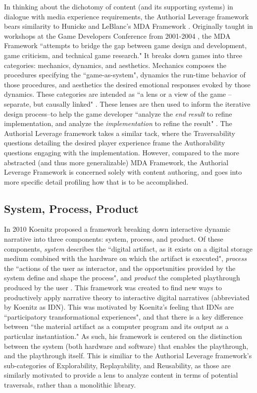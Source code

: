 In thinking about the dichotomy of content (and its supporting systems) in dialogue with media experience requirements, the Authorial Leverage framework bears similarity to Hunicke and LeBlanc's MDA Framework \cite{hunicke2004mda}. Originally taught in workshops at the Game Developers Conference from 2001-2004 \cite{leblanc_2001}, the MDA Framework ``attempts to bridge the gap between game design and development, game criticism, and technical game research." It breaks down games into three categories: mechanics, dynamics, and aesthetics. Mechanics composes the procedures specifying the ``game-as-system", dynamics the run-time behavior of those procedures, and aesthetics the desired emotional responses evoked by those dynamics. These categories are intended as ``a lens or a view of the game -- separate, but causally linked" \cite{leblanc_2004}. These lenses are then used to inform the iterative design process--to help the game developer ``analyze the \textit{end result} to refine implementation, and analyze the \textit{implementation} to refine the result" \cite{hunicke2004mda}. The Authorial Leverage framework takes a similar tack, where the Traversability questions detailing the desired player experience frame the Authorability questions engaging with the implementation. However, compared to the more abstracted (and thus more generalizable) MDA Framework, the Authorial Leverage Framework is concerned solely with content authoring, and goes into more specific detail profiling how that is to be accomplished.

\subsection{System, Process, Product}

In 2010 Koenitz proposed a framework breaking down interactive dynamic narrative into three components: system, process, and product. Of these components, \textit{system} describes the ``digital artifact, as it exists on a digital storage medium combined with the hardware on which the artifact is executed", \textit{process} the ``actions of the user as interactor, and the opportunities provided by the system define and shape the process", and \textit{product} the completed playthrough produced by the user \cite{koenitz_framework}. This framework was created to find new ways to productively apply narrative theory to interactive digital narratives (abbreviated by Koenitz as IDN). This was motivated by Koenitz's feeling that IDNs are ``participatory transformational experiences", and that there is a key difference between ``the material artifact as a computer program and its output as a particular instantiation." As such, his framework is centered on the distinction between the system (both hardware and software) that enables the playthrough, and the playthrough itself. This is similiar to the Authorial Leverage framework's sub-categories of Explorability, Replayability, and Reusability, as those are similarly motivated to provide a lens to analyze content in terms of potential traversals, rather than a monolithic library.

